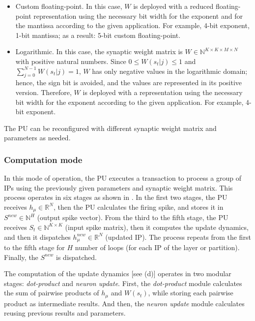 \begin{itemize}
	\item{Custom floating-point}.
	In this case, $W$ is deployed with a reduced floating-point representation using the necessary bit width for the exponent and for the mantissa according to the given application. For example, 4-bit exponent, 1-bit mantissa; as a result: 5-bit custom floating-point.
	\item{Logarithmic}.
	In this case, the synaptic weight matrix is $W\in\mathbb{N}^{K\times K\times M\times N}$ with positive natural numbers. Since $0\le W(s_t|j)\le1$ and $\sum_{j=0}^{N-1}W(s_t|j)=1$, $W$ has only negative values in the logarithmic domain; hence, the sign bit is avoided, and the values are represented in its positive version. Therefore, $W$ is deployed with a representation using the necessary bit width for the exponent according to the given application. For example, 4-bit exponent.
\end{itemize}

The PU can be reconfigured with different synaptic weight matrix and parameters as needed.

\subsubsection{Computation mode}
In this mode of operation, the PU executes a transaction to process a group of IPs using the previously given parameters and synaptic weight matrix. This process operates in six stages as shown in . In the first two stages, the PU receives $h_\mu\in\mathbb{R}^{N}$, then the PU calculates the firing spike, and stores it in $S^{new}\in\mathbb{N}^{H}$ (output spike vector). From the third to the fifth stage, the PU receives $S_t\in\mathbb{N}^{K\times K}$ (input spike matrix), then it computes the update dynamics, and then it dispatches $h_\mu^{new}\in\mathbb{R}^{N}$ (updated IP). The process repeats from the first to the fifth stage for $H$ number of loops (for each IP of the layer or partition). Finally, the $S^{new}$ is dispatched.

The computation of the update dynamics [see (d)] operates in two modular stages: \emph{dot-product} and \emph{neuron update}. First, the \emph{dot-product} module calculates the sum of pairwise products of $h_{\mu}$ and $W(s_t)$, while storing each pairwise product as intermediate results. And then, the \emph{neuron update} module calculates  reusing previous results and parameters.


